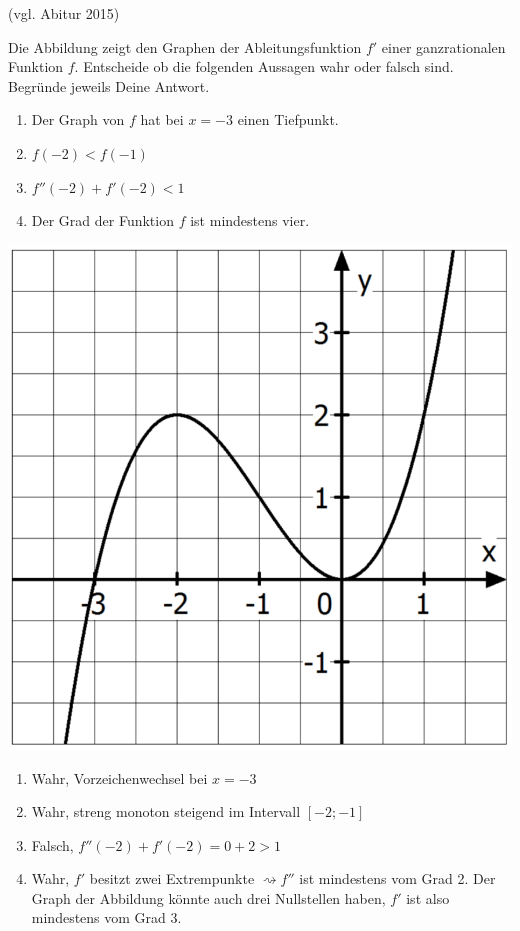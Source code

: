  (vgl. Abitur 2015)
\begin{multicols}{2}
	Die Abbildung zeigt den Graphen der Ableitungsfunktion $f'$ einer ganzrationalen Funktion $f$.
	Entscheide ob die folgenden Aussagen wahr oder falsch sind. Begründe jeweils Deine Antwort.
	\begin{enumerate}
		\item Der Graph von $f$ hat bei $x=-3$ einen Tiefpunkt.
		\item $f(-2)<f(-1)$
		\item $f''(-2)+f'(-2)<1$
		\item Der Grad der Funktion $f$ ist mindestens vier.
	\end{enumerate}
	\columnbreak

	\centering
	\includegraphics[width=0.7\linewidth]{Graphanalyse.png}
\end{multicols}

\begin{lsg}{}
	\begin{enumerate}
		\item Wahr, Vorzeichenwechsel bei $x=-3$
		\item Wahr, streng monoton steigend im Intervall $[-2;-1]$
		\item Falsch, $f''(-2)+f'(-2)=0+2>1$
		\item Wahr, $f'$ besitzt zwei Extrempunkte $\rightsquigarrow f''$ ist mindestens vom Grad 2. Der Graph der Abbildung könnte auch drei Nullstellen haben, $f'$ ist also mindestens vom Grad 3.
	\end{enumerate}
\end{lsg}




\begin{lsg}{}
	
\end{lsg}



